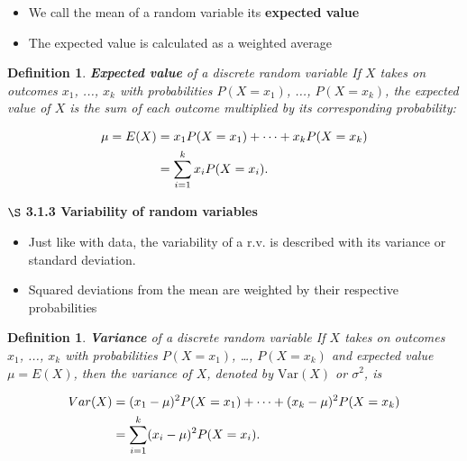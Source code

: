 \documentclass[12pt]{amsart}
\newtheorem{definition}[theorem]{Definition}
\begin{document}
{\begin{itemize}
\item We call the mean of a random variable its \textbf{expected value}
\item The expected value is calculated as a weighted average
\end{itemize}

\vspace{.5cm}

\begin{definition}{\textbf{Expected value} of a discrete random variable} \newline
If $X$ takes on outcomes $x_1$, ..., $x_k$ with probabilities $P(X=x_1)$, ..., $P(X=x_k)$, the expected value of $X$ is the sum of each outcome multiplied by its corresponding probability:

\color{blue}
\begin{align}
\mu = E(X) 	&= x_1 P(X=x_1) + \cdots + x_k P(X=x_k) \notag \\
&= \sum_{i=1}^{k}x_iP(X=x_i). \notag 
\end{align}
\color{black}
\end{definition}

\vspace{1.5cm}

$\S$ \textbf{3.1.3 Variability of random variables}

\vspace{.5cm}

\begin{itemize}
\item Just like with data, the variability of a r.v. is described with its variance or standard deviation.
\item Squared deviations from the mean are weighted by their respective probabilities
\end{itemize}

\vspace{.5cm}

\begin{definition}{\textbf{Variance} of a discrete random variable} \newline
If $X$ takes on outcomes $x_1$, ..., $x_k$ with probabilities $P(X=x_1)$, \dots, $P(X=x_k)$ and expected value $\mu=E(X)$, then the variance of $X$, denoted by $\text{Var}(X)$ or $\sigma^2$, is

\color{blue}
\begin{align}
Var(X) &= (x_1-\mu)^2 P(X=x_1) + \cdots \notag + (x_k-\mu)^2 P(X=x_k) \notag \\
&= \sum_{i=1}^{k} (x_i - \mu)^2 P(X=x_i). \notag 
\end{align}
\end{definition}
\color{black}
\vspace{2cm}

}
\end{document}
